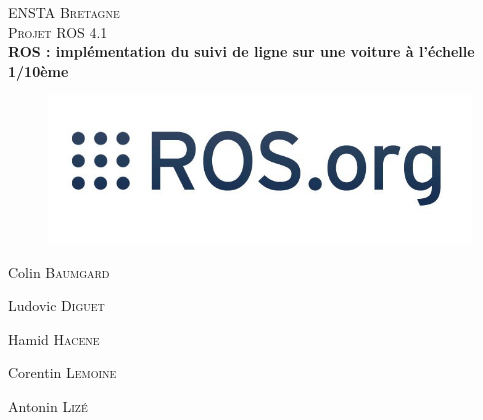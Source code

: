 \documentclass[12pt, openany]{report}
\begin{document}
\author{Colin Baumgard}
\author{Ludovic Diguet}
\author{Hamid Hacene}
\author{Corentin Lemoine}
\author{Antonin Lizé}

\begin{titlepage}
  \begin{sffamily}
    \begin{center}

      \textsc{\LARGE ENSTA Bretagne}\\[2cm]

      \textsc{\Large Projet ROS 4.1}\\[1.5cm]

      { \huge \bfseries ROS : implémentation du suivi de ligne sur une voiture à l'échelle 1/10ème\\[0.4cm] }
      \vfill

      \begin{figure}[H]
        \hfill \includegraphics[scale=0.6]{img/logoROS.jpg} \hspace*{\fill}
      \end{figure}

      \vfill


      \begin{minipage}{0.30\textwidth}
        Colin \textsc{Baumgard}
      \end{minipage}
      \begin{minipage}{0.30\textwidth}
        Ludovic \textsc{Diguet}
      \end{minipage}
      \begin{minipage}{0.30\textwidth}
        Hamid \textsc{Hacene}
      \end{minipage}
      \begin{minipage}{0.30\textwidth}
        Corentin \textsc{Lemoine}
      \end{minipage}
      \begin{minipage}{0.30\textwidth}
        Antonin \textsc{Lizé}
      \end{minipage}

    \end{center}
  \end{sffamily}
\end{titlepage}
\end{document}
